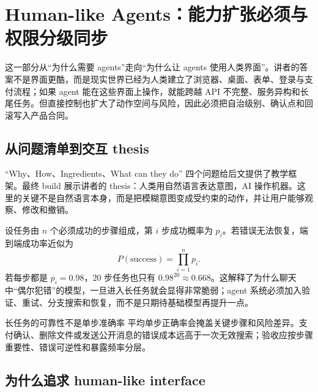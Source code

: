 \section{Human-like Agents：能力扩张必须与权限分级同步}

这一部分从“为什么需要 agents”走向“为什么让 agents 使用人类界面”。讲者的答案不是界面更酷，而是现实世界已经为人类建立了浏览器、桌面、表单、登录与支付流程；如果 agent 能在这些界面上操作，就能跨越 API 不完整、服务异构和长尾任务。但直接控制也扩大了动作空间与风险，因此必须把自治级别、确认点和回滚写入产品合同。



\subsection{从问题清单到交互 thesis}

“Why、How、Ingredients、What can they do” 四个问题给后文提供了教学框架。最终 build 展示讲者的 thesis：人类用自然语言表达意图，AI 操作机器。这里的关键不是自然语言本身，而是把模糊意图变成受约束的动作，并让用户能够观察、修改和撤销。




设任务由 $n$ 个必须成功的步骤组成，第 $i$ 步成功概率为 $p_i$。若错误无法恢复，端到端成功率近似为
\[
P(\text{success})=\prod_{i=1}^{n}p_i.
\]
若每步都是 $p_i=0.98$，20 步任务也只有 $0.98^{20}\approx 0.668$。这解释了为什么聊天中“偶尔犯错”的模型，一旦进入长任务就会显得非常脆弱；agent 系统必须加入验证、重试、分支搜索和恢复，而不是只期待基础模型再提升一点。

\begin{warningbox}{长任务的可靠性不是单步准确率}
平均单步正确率会掩盖关键步骤和风险差异。支付确认、删除文件或发送公开消息的错误成本远高于一次无效搜索；验收应按步骤重要性、错误可逆性和暴露频率分层。
\end{warningbox}

\subsection{为什么追求 human-like interface}

